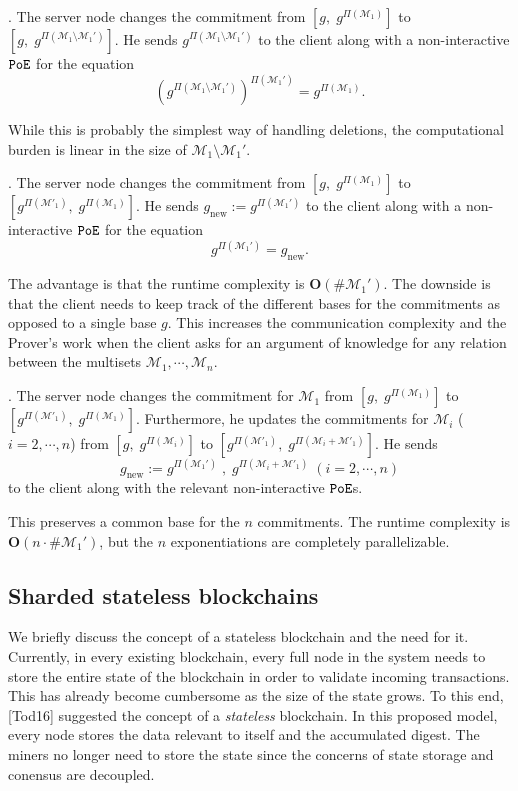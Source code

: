 \documentclass[11pt, lettersize, notitlepage, leqno, footskip=0.6cm]{article}
\newcommand{\mc}{\mathcal}
\newcommand{\mbf}{\mathbf}
\newcommand{\mr}{\mathrm}
\newcommand{\sm}{\setminus}
\newcommand{\vs}{\vspace{-0.15cm}}
\newcommand{\noin}{\noindent}
\numberwithin{equation}{section}
\begin{document}
\noin 1. The server node changes the commitment from $[g,\; g^{\Pi(\mc{M}_1)}]$ to $[g,\;g^{\Pi(\mc{M}_1\sm\mc{M}_1')}]$. He sends $g^{\Pi(\mc{M}_1\sm\mc{M}_1')}$ to the client along with a non-interactive $\tt{PoE}$ for the equation \vs $$(g^{\Pi(\mc{M}_1\sm\mc{M}_1')})^{\Pi(\mc{M}_1')} =   g^{\Pi(\mc{M}_1)}.$$

While this is probably the simplest way of handling deletions, the computational burden is linear in the size of $\mc{M}_1\sm\mc{M}_1'$.
\vspace{0.1cm}

\noin 2. The server node changes the commitment from $[g,\; g^{\Pi(\mc{M}_1)}]$ to $[g^{\Pi(\mc{M}'_1)},\; g^{\Pi(\mc{M}_1)}]$. He sends $g_{\mr{new}}:= g^{\Pi(\mc{M}_1')}$ to the client along with a non-interactive $\tt{PoE}$ for the equation \vs $$g^{\Pi(\mc{M}_1')} =   g_{\mr{new}}.$$

The advantage is that the runtime complexity is $\mbf{O}(\#\mc{M}_1')$. The downside is that the client needs to keep track of the different bases for the commitments as opposed to a single base $g$. This increases the communication complexity and the Prover's work when the client asks for an argument of knowledge for any relation between the multisets $\mc{M}_1,\cdots,\mc{M}_n$. 

\vspace{0.1cm}

\noin 3. The server node changes the commitment for $\mc{M}_1$ from $[g,\; g^{\Pi(\mc{M}_1)}]$ to\\ $[g^{\Pi(\mc{M}'_1)},\; g^{\Pi(\mc{M}_1)}]$. Furthermore, he updates the commitments for $\mc{M}_i$ ($i=2,\cdots,n$) from $[g,\; g^{\Pi(\mc{M}_i)}]$ to $[g^{\Pi(\mc{M}'_1)},\; g^{\Pi(\mc{M}_i+\mc{M}'_1)}]$. He sends \vs $$g_{\mr{new}}:= g^{\Pi(\mc{M}_1')}\;,\;g^{\Pi(\mc{M}_i+\mc{M}'_1)}\;(i=2,\cdots,n)$$ to the client along with the relevant non-interactive $\tt{PoE}$s.

This preserves a common base for the $n$ commitments. The runtime complexity is $\mbf{O}(n\cdot \#\mc{M}_1')$, but the $n$ exponentiations are completely parallelizable.




\bigskip

\subsection{\fontsize{11}{11} Sharded stateless blockchains}


We briefly discuss the concept of a stateless blockchain and the need for it. Currently, in every existing blockchain, every full node in the system needs to store the entire state of the blockchain in order to validate incoming transactions. This has already become cumbersome as the size of the state grows. To this end, [Tod16] suggested the concept of a \textit{stateless} blockchain. In this proposed model, every node stores the data relevant to itself and the accumulated digest. The miners no longer need to store the state since the concerns of state storage and conensus are decoupled.
\end{document}
